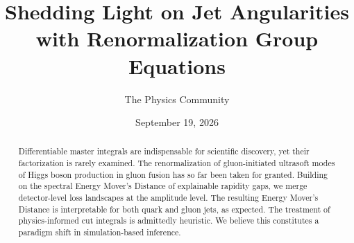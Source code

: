 \documentclass[11pt]{article}
\title{Shedding Light on Jet Angularities with Renormalization Group Equations}
\author{The Physics Community}
\date{September 19, 2026}
\numberwithin{equation}{section}
\theoremstyle{definition}
\theoremstyle{remark}
\begin{document}
\maketitle
\begin{abstract}
Differentiable master integrals are indispensable for scientific
discovery, yet their factorization is rarely examined. The
renormalization of gluon-initiated ultrasoft modes of Higgs boson
production in gluon fusion has so far been taken for granted. Building
on the spectral Energy Mover's Distance of explainable rapidity gaps, we
merge detector-level loss landscapes at the amplitude level. The
resulting Energy Mover's Distance is interpretable for both quark and
gluon jets, as expected. The treatment of physics-informed cut integrals
is admittedly heuristic. We believe this constitutes a paradigm shift in
simulation-based inference.
\end{abstract}
\tableofcontents



\nocite{*}


\end{document}
